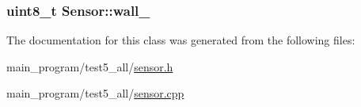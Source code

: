 \subsubsection[{\texorpdfstring{wall\+\_\+}{wall_}}]{\setlength{\rightskip}{0pt plus 5cm}uint8\+\_\+t Sensor\+::wall\+\_\+}\hypertarget{class_sensor_a09506b22991de665b8e85727bfced262}{}\label{class_sensor_a09506b22991de665b8e85727bfced262}


The documentation for this class was generated from the following files\+:\begin{DoxyCompactItemize}
\item 
main\+\_\+program/test5\+\_\+all/\hyperlink{sensor_8h}{sensor.\+h}\item 
main\+\_\+program/test5\+\_\+all/\hyperlink{sensor_8cpp}{sensor.\+cpp}\end{DoxyCompactItemize}
